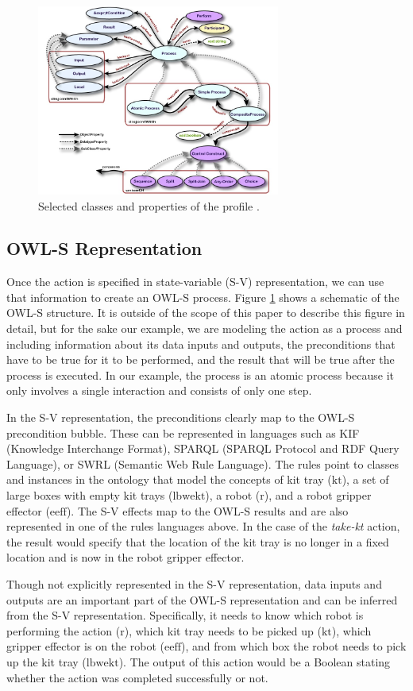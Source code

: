 \begin{figure}[htb]
\includegraphics[width=8cm]{images/OWL-S.jpg}
\caption{Selected classes and properties of the profile \cite{OWL-S}.}
\label{fig:OWL-S}
\end{figure}
\subsection{OWL-S Representation}
Once the action is specified in state-variable (S-V) representation, we can use that information to create an OWL-S process. Figure \ref{fig:OWL-S} shows a schematic of the OWL-S structure. It is outside of the scope of this paper to describe this figure in detail, but for the sake our example, we are modeling the action as a process and including information about its data inputs and outputs, the preconditions that have to be true for it to be performed, and the result that will be true after the process is executed. In our example, the process is an atomic process because it only involves a single interaction and consists of only one step.

In the S-V representation, the preconditions clearly map to the OWL-S precondition bubble. These can be represented in languages such as KIF (Knowledge Interchange Format), SPARQL (SPARQL Protocol and RDF Query Language), or SWRL (Semantic Web Rule Language). The rules point to classes and instances in the ontology that model the concepts of kit tray ($\mathrm{kt}$), a set of large boxes with empty kit trays ($\mathrm{lbwekt}$), a robot ($\mathrm{r}$), and a robot gripper effector ($\mathrm{eeff}$). The S-V effects map to the OWL-S results and are also represented in one of the rules languages above. In the case of the \textsl{take-kt} action, the result would specify that the location of the kit tray is no longer in a fixed location and is now in the robot gripper effector.

Though not explicitly represented in the S-V representation, data inputs and outputs are an important part of the OWL-S representation and can be inferred from the S-V representation. Specifically, it needs to know which robot is performing the action ($\mathrm{r}$), which kit tray needs to be picked up ($\mathrm{kt}$), which gripper effector is on the robot ($\mathrm{eeff}$), and from which box the robot needs to pick up the kit tray ($\mathrm{lbwekt}$). The output of this action would be a Boolean stating whether the action was completed successfully or not. 